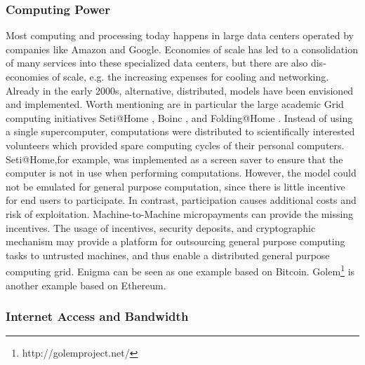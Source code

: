 \subsubsection{Computing Power}

Most computing and processing today happens in large data centers operated by companies like Amazon and Google. Economies of scale has led to a consolidation of many services into these specialized data centers, but there are also dis-economies of scale, e.g. the increasing expenses for cooling and networking. Already in the early 2000s, alternative, distributed, models have been envisioned and implemented. Worth mentioning are in particular the large academic Grid computing initiatives Seti@Home \parencite{Anderson:2002:SEP:581571.581573}, Boinc \parencite{Anderson2004boinc}, and Folding@Home \parencite{Beberg2009Folding}. Instead of using a single supercomputer, computations were distributed to scientifically interested volunteers which provided spare computing cycles of their personal computers. Seti@Home,for example, was implemented as a screen saver to ensure that the computer is not in use when performing computations. However, the model could not be emulated for general purpose computation, since there is little incentive for end users to participate. In contrast, participation causes additional costs and risk of exploitation.
Machine-to-Machine micropayments can provide the missing incentives. The usage of incentives, security deposits, and cryptographic mechanism may provide a platform for outsourcing general purpose computing tasks to untrusted machines, and thus enable a distributed general purpose computing grid. Enigma can be seen as one example based on Bitcoin. Golem\footnote{http://golemproject.net/} is another example based on Ethereum.



\subsubsection{Internet Access and Bandwidth}

